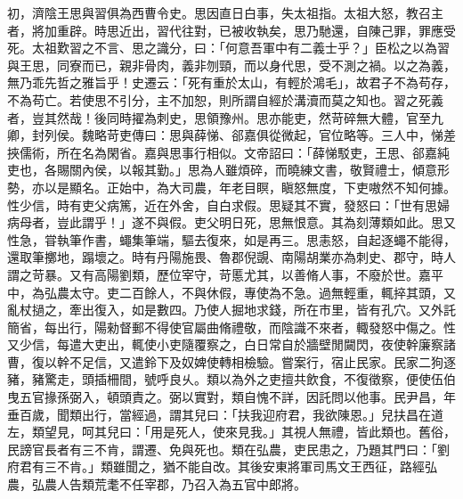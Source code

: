 \begin{pinyinscope}
初，濟陰王思與習俱為西曹令史。思因直日白事，失太祖指。太祖大怒，教召主者，將加重辟。時思近出，習代往對，已被收執矣，思乃馳還，自陳己罪，罪應受死。太祖歎習之不言、思之識分，曰：「何意吾軍中有二義士乎？」臣松之以為習與王思，同寮而已，親非骨肉，義非刎頸，而以身代思，受不測之禍。以之為義，無乃乖先哲之雅旨乎！史遷云：「死有重於太山，有輕於鴻毛」，故君子不為苟存，不為苟亡。若使思不引分，主不加恕，則所謂自經於溝瀆而莫之知也。習之死義者，豈其然哉！後同時擢為刺史，思領豫州。思亦能吏，然苛碎無大體，官至九卿，封列侯。魏略苛吏傳曰：思與薛悌、郤嘉俱從微起，官位略等。三人中，悌差挾儒術，所在名為閑省。嘉與思事行相似。文帝詔曰：「薛悌駁吏，王思、郤嘉純吏也，各賜關內侯，以報其勤。」思為人雖煩碎，而曉練文書，敬賢禮士，傾意形勢，亦以是顯名。正始中，為大司農，年老目瞑，瞋怒無度，下吏嗷然不知何據。性少信，時有吏父病篤，近在外舍，自白求假。思疑其不實，發怒曰：「世有思婦病母者，豈此謂乎！」遂不與假。吏父明日死，思無恨意。其為刻薄類如此。思又性急，甞執筆作書，蠅集筆端，驅去復來，如是再三。思恚怒，自起逐蠅不能得，還取筆擲地，蹋壞之。時有丹陽施畏、魯郡倪覬、南陽胡業亦為刺史、郡守，時人謂之苛暴。又有高陽劉類，歷位宰守，苛慝尤其，以善脩人事，不廢於世。嘉平中，為弘農太守。吏二百餘人，不與休假，專使為不急。過無輕重，輒捽其頭，又亂杖撾之，牽出復入，如是數四。乃使人掘地求錢，所在市里，皆有孔穴。又外託簡省，每出行，陽勑督郵不得使官屬曲脩禮敬，而陰識不來者，輙發怒中傷之。性又少信，每遣大吏出，輒使小吏隨覆察之，白日常自於牆壁閒闚閃，夜使幹廉察諸曹，復以幹不足信，又遣鈴下及奴婢使轉相檢驗。嘗案行，宿止民家。民家二狗逐豬，豬驚走，頭插柵間，號呼良乆。類以為外之吏擅共飲食，不復徵察，便使伍伯曳五官掾孫弼入，頓頭責之。弼以實對，類自愧不詳，因託問以他事。民尹昌，年垂百歲，聞類出行，當經過，謂其兒曰：「扶我迎府君，我欲陳恩。」兒扶昌在道左，類望見，呵其兒曰：「用是死人，使來見我。」其視人無禮，皆此類也。舊俗，民謗官長者有三不肯，謂遷、免與死也。類在弘農，吏民患之，乃題其門曰：「劉府君有三不肯。」類雖聞之，猶不能自改。其後安東將軍司馬文王西征，路經弘農，弘農人告類荒耄不任宰郡，乃召入為五官中郎將。


\end{pinyinscope}